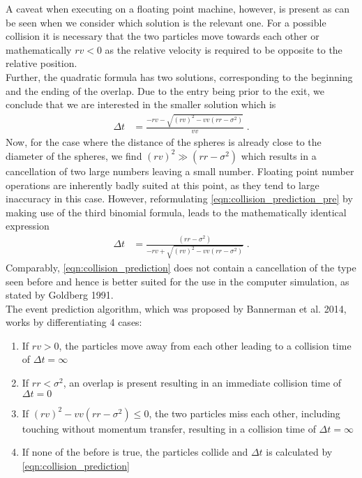 A caveat when executing on a floating point machine, however, is present as can be seen when we consider which solution is the relevant one. For a possible collision it is necessary that the two particles move towards each other or mathematically $rv<0$ as the relative velocity is required to be opposite to the relative position.\\

Further, the quadratic formula has two solutions, corresponding to the beginning and the ending of the overlap. Due to the entry being prior to the exit, we conclude that we are interested in the smaller solution which is
\begin{align}
\label{eqn:collision_prediction_pre}
\Delta t &= \frac{ - rv - \sqrt{ (rv)^2  - vv (rr - \sigma^2 )} }{vv} \; \text{.}
\end{align}
Now, for the case where the distance of the spheres is already close to the diameter of the spheres, we find $(rv)^2 \gg (rr-\sigma^2)$ which results in a cancellation of two large numbers leaving a small number. Floating point number operations are inherently badly suited at this point, as they tend to large inaccuracy in this case. However, reformulating \autoref{eqn:collision_prediction_pre} by making use of the third binomial formula, leads to the mathematically identical expression
\begin{align}
\label{eqn:collision_prediction}
\Delta t &= \frac{(rr - \sigma^2 )}{ - rv + \sqrt{ (rv)^2  - vv (rr - \sigma^2 )}} \; \text{.}
\end{align}
Comparably, \autoref{eqn:collision_prediction} does not contain a cancellation of the type seen before and hence is better suited for the use in the computer simulation, as stated by Goldberg 1991\cite{Goldberg1991}.\\

The event prediction algorithm, which was proposed by Bannerman et al. 2014\cite{Bannerman2014}, works by differentiating 4 cases:
\begin{enumerate}
\item If $rv>0$, the particles move away from each other leading to a collision time of $\Delta t = \infty$
\item If $rr<\sigma^2$, an overlap is present resulting in an immediate collision time of $\Delta t = 0$
\item If $(rv)^2  - vv (rr - \sigma^2 ) \leq 0 $, the two particles miss each other, including touching without momentum transfer, resulting in a collision time of $\Delta t = \infty$
\item If none of the before is true, the particles collide and $\Delta t$ is calculated by \autoref{eqn:collision_prediction}
\end{enumerate}

